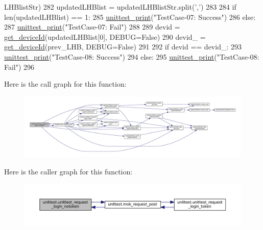 \begin{DoxyCode}
      LHBlistStr)
282     updatedLHBlist = updatedLHBlistStr.split(\textcolor{stringliteral}{','})
283 
284     \textcolor{keywordflow}{if} len(updatedLHBlist) == 1:
285         \hyperlink{namespaceunittest_a217a1a3af5bc9748f2f6194bf79402bc}{unittest\_print}(\textcolor{stringliteral}{"TestCase-07: Success"})
286     \textcolor{keywordflow}{else}:
287         \hyperlink{namespaceunittest_a217a1a3af5bc9748f2f6194bf79402bc}{unittest\_print}(\textcolor{stringliteral}{"TestCase-07: Fail"})
288 
289     devid = \hyperlink{namespaceloginhashblock_a17417f2f6bca76ab51170082a562e5f6}{get\_deviceId}(updatedLHBlist[0], DEBUG=\textcolor{keyword}{False})
290     devid\_ = \hyperlink{namespaceloginhashblock_a17417f2f6bca76ab51170082a562e5f6}{get\_deviceId}(prev\_LHB, DEBUG=\textcolor{keyword}{False})
291 
292     \textcolor{keywordflow}{if} devid == devid\_:
293         \hyperlink{namespaceunittest_a217a1a3af5bc9748f2f6194bf79402bc}{unittest\_print}(\textcolor{stringliteral}{"TestCase-08: Success"})
294     \textcolor{keywordflow}{else}:
295         \hyperlink{namespaceunittest_a217a1a3af5bc9748f2f6194bf79402bc}{unittest\_print}(\textcolor{stringliteral}{"TestCase-08: Fail"})
296 
\end{DoxyCode}


Here is the call graph for this function\+:\nopagebreak
\begin{figure}[H]
\begin{center}
\leavevmode
\includegraphics[width=350pt]{namespaceunittest_a8b30a1b14f91e9e9d093c13a7e68ee93_cgraph}
\end{center}
\end{figure}




Here is the caller graph for this function\+:\nopagebreak
\begin{figure}[H]
\begin{center}
\leavevmode
\includegraphics[width=350pt]{namespaceunittest_a8b30a1b14f91e9e9d093c13a7e68ee93_icgraph}
\end{center}
\end{figure}


